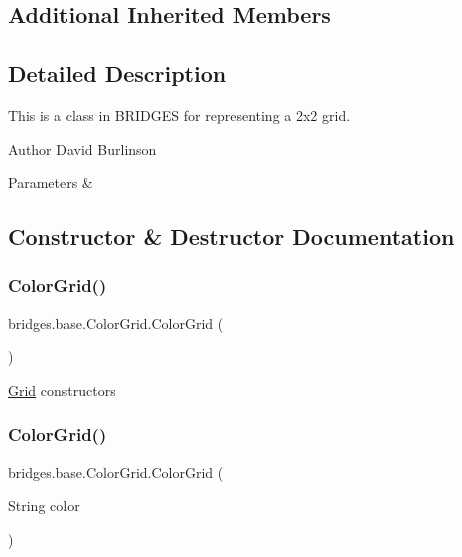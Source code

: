\subsection*{Additional Inherited Members}


\subsection{Detailed Description}
This is a class in B\+R\+I\+D\+G\+ES for representing a 2x2 grid. 

\begin{DoxyAuthor}{Author}
David Burlinson 
\end{DoxyAuthor}

\begin{DoxyParams}{Parameters}
{\em } & \\
\hline
\end{DoxyParams}


\subsection{Constructor \& Destructor Documentation}
\mbox{\label{classbridges_1_1base_1_1_color_grid_af434a5a3dcbaf86e51ac6f9e1c1d7e5f}} 
\subsubsection{\texorpdfstring{Color\+Grid()}{ColorGrid()}\hspace{0.1cm}{\footnotesize\ttfamily [1/5]}}
{\footnotesize\ttfamily bridges.\+base.\+Color\+Grid.\+Color\+Grid (\begin{DoxyParamCaption}{ }\end{DoxyParamCaption})}

\mbox{\hyperlink{classbridges_1_1base_1_1_grid}{Grid}} constructors \mbox{\label{classbridges_1_1base_1_1_color_grid_ab6402fcf5ca5047ac2043df57b5c32bd}} 
\subsubsection{\texorpdfstring{Color\+Grid()}{ColorGrid()}\hspace{0.1cm}{\footnotesize\ttfamily [2/5]}}
{\footnotesize\ttfamily bridges.\+base.\+Color\+Grid.\+Color\+Grid (\begin{DoxyParamCaption}\item[{String}]{color }\end{DoxyParamCaption})}


